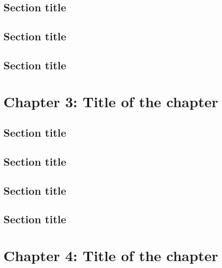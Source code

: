 \documentclass[
]{article}
\begin{document}
\hypertarget{section-title-2}{%
\subsection{Section title}\label{section-title-2}}

\hypertarget{section-title-3}{%
\subsection{Section title}\label{section-title-3}}

\hypertarget{section-title-4}{%
\subsection{Section title}\label{section-title-4}}

\pagebreak

\hypertarget{chapter-3-title-of-the-chapter}{%
\section{Chapter 3: Title of the chapter}\label{chapter-3-title-of-the-chapter}}

\hypertarget{section-title-5}{%
\subsection{Section title}\label{section-title-5}}

\hypertarget{section-title-6}{%
\subsection{Section title}\label{section-title-6}}

\hypertarget{section-title-7}{%
\subsection{Section title}\label{section-title-7}}

\hypertarget{section-title-8}{%
\subsection{Section title}\label{section-title-8}}

\pagebreak

\hypertarget{chapter-4-title-of-the-chapter}{%
\section{Chapter 4: Title of the chapter}\label{chapter-4-title-of-the-chapter}}
\end{document}
